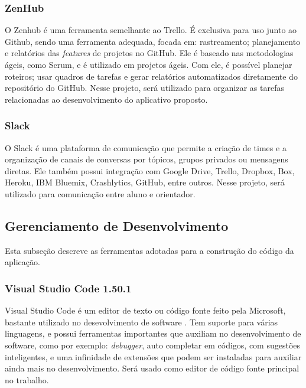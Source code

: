 \subsubsection{ZenHub}

O Zenhub \cite{zenhub2020} é uma ferramenta semelhante ao Trello. É exclusiva para uso junto ao 
Github, sendo uma ferramenta adequada, focada em: rastreamento; planejamento e 
relatórios das \emph{features} de projetos no GitHub. Ele é baseado nas 
metodologias ágeis, como Scrum, e é utilizado em projetos ágeis. Com ele, 
é possível planejar roteiros; usar quadros de tarefas e gerar relatórios 
automatizados diretamente do repositório do GitHub. 
Nesse projeto, será utilizado para organizar as tarefas relacionadas ao 
desenvolvimento do aplicativo proposto.


\subsubsection{Slack}

O Slack \cite{slack2013} é uma plataforma de comunicação que permite a criação de times e a 
organização de canais de conversas por tópicos, grupos privados ou mensagens 
diretas. Ele também possui integração com  Google Drive, Trello, Dropbox, Box, 
Heroku, IBM Bluemix, Crashlytics, GitHub, entre outros. Nesse 
projeto, será utilizado para comunicação entre aluno e orientador.

\subsection{Gerenciamento de Desenvolvimento}

Esta subseção descreve as ferramentas adotadas para a construção do código da aplicação.

\subsubsection{Visual Studio Code 1.50.1}

Visual Studio Code é um editor de texto ou código fonte feito pela Microsoft, 
bastante utilizado no desevolvimento de software \cite{vscode2015}. Tem suporte 
para várias linguagens, e possui ferramentas importantes que auxiliam no 
desenvolvimento de software, como por exemplo: \emph{debugger}, auto completar em 
códigos, com sugestões inteligentes, e uma infinidade de extensões que podem ser instaladas para auxiliar ainda mais no desenvolvimento. Será usado como editor de código fonte principal no trabalho. 

